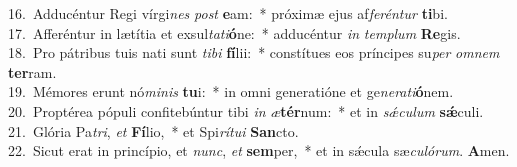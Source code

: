 {16.~}Adducéntur Regi vírgi\textit{nes} \textit{post} \textbf{e}am:~* próximæ ejus af\textit{fe}\textit{rén}\textit{tur} \textbf{ti}bi.\\
{17.~}Afferéntur in lætítia et exsul\textit{ta}\textit{ti}\textbf{ó}ne:~* adducéntur \textit{in} \textit{tem}\textit{plum} \textbf{Re}gis.\\
{18.~}Pro pátribus tuis nati sunt \textit{ti}\textit{bi} \textbf{fí}lii:~* constítues eos príncipes su\textit{per} \textit{om}\textit{nem} \textbf{ter}ram.\\
{19.~}Mémores erunt nó\textit{mi}\textit{nis} \textbf{tu}i:~* in omni generatióne et ge\textit{ne}\textit{ra}\textit{ti}\textbf{ó}nem.\\
{20.~}Proptérea pópuli confitebúntur tibi \textit{in} \textit{æ}\textbf{tér}num:~* et in \textit{sǽ}\textit{cu}\textit{lum} \textbf{sǽ}culi.\\
{21.~}Glória Pa\textit{tri}, \textit{et} \textbf{Fí}lio,~* et Spi\textit{rí}\textit{tu}\textit{i} \textbf{San}cto.\\
{22.~}Sicut erat in princípio, et \textit{nunc}, \textit{et} \textbf{sem}per,~* et in sǽcula sæ\textit{cu}\textit{ló}\textit{rum}. \textbf{A}men.\\
